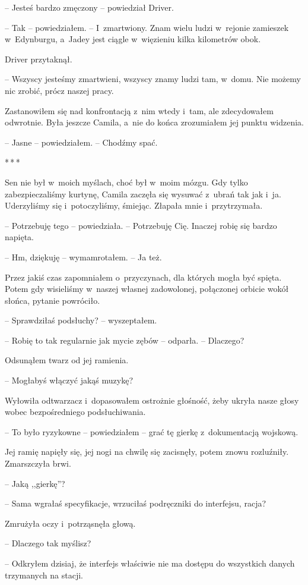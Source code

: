 \documentclass[oneside,polish,12pt,sfheadings]{mwbk}
\newcommand{\threeast}{\bigskip\par\centerline{*\,*\,*}\medskip\par}%
\begin{document}
-- Jesteś bardzo zmęczony -- powiedział Driver.

-- Tak -- powiedziałem. -- I~zmartwiony. Znam wielu ludzi w~rejonie
zamieszek w~Edynburgu, a~Jadey jest ciągle w~więzieniu kilka kilometrów
obok.

Driver przytaknął. 

-- Wszyscy jesteśmy zmartwieni, wszyscy znamy ludzi
tam, w~domu. Nie możemy nic zrobić, prócz naszej pracy.

Zastanowiłem się nad konfrontacją z~nim wtedy i~tam, ale zdecydowałem
odwrotnie. Była jeszcze Camila, a~nie do końca zrozumiałem jej punktu
widzenia.

-- Jasne -- powiedziałem. -- Chodźmy spać.

\threeast

Sen nie był w~moich myślach, choć był w~moim mózgu. Gdy tylko
zabezpieczaliśmy kurtynę, Camila zaczęła się wysuwać z~ubrań tak jak i~ja. Uderzyliśmy się i~potoczyliśmy, śmiejąc. Złapała mnie i~przytrzymała.

-- Potrzebuję tego -- powiedziała. -- Potrzebuję Cię. Inaczej robię się
bardzo napięta.

-- Hm, dziękuję -- wymamrotałem. -- Ja też.

Przez jakiś czas zapomniałem o~przyczynach, dla których mogła być
spięta. Potem gdy wisieliśmy w~naszej własnej zadowolonej, połączonej
orbicie wokół słońca, pytanie powróciło.

-- Sprawdziłaś podsłuchy? -- wyszeptałem.

-- Robię to tak regularnie jak mycie zębów -- odparła. -- Dlaczego?

Odsunąłem twarz od jej ramienia.

-- Mogłabyś włączyć jakąś muzykę?

Wyłowiła odtwarzacz i~dopasowałem ostrożnie głośność, żeby ukryła nasze
głosy wobec bezpośredniego podsłuchiwania.

-- To było ryzykowne -- powiedziałem -- grać tę gierkę z~dokumentacją
wojskową.

Jej ramię napięły się, jej nogi na chwilę się zacisnęły, potem znowu
rozluźniły. Zmarszczyła brwi.

-- Jaką ,,gierkę''?

-- Sama wgrałaś specyfikacje, wrzuciłaś podręczniki do interfejsu, racja?

Zmrużyła oczy i~potrząsnęła głową.

-- Dlaczego tak myślisz?

-- Odkryłem dzisiaj, że interfejs właściwie nie ma dostępu do wszystkich
danych trzymanych na stacji.
\end{document}
